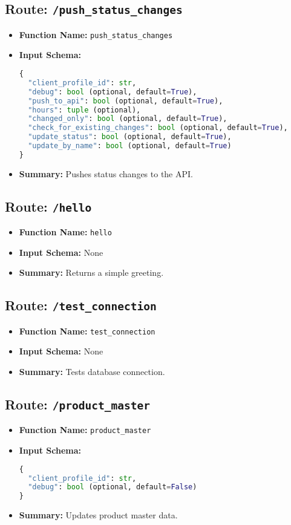 \subsection{Route: \texttt{/push\_status\_changes}}
\begin{itemize}
  \item \textbf{Function Name:} \texttt{push\_status\_changes}
  \item \textbf{Input Schema:}
        \begin{lstlisting}[language=Python]
{
  "client_profile_id": str,
  "debug": bool (optional, default=True),
  "push_to_api": bool (optional, default=True),
  "hours": tuple (optional),
  "changed_only": bool (optional, default=True),
  "check_for_existing_changes": bool (optional, default=True),
  "update_status": bool (optional, default=True),
  "update_by_name": bool (optional, default=True)
}
  \end{lstlisting}
  \item \textbf{Summary:} Pushes status changes to the API.
\end{itemize}

\subsection{Route: \texttt{/hello}}
\begin{itemize}
  \item \textbf{Function Name:} \texttt{hello}
  \item \textbf{Input Schema:} None
  \item \textbf{Summary:} Returns a simple greeting.
\end{itemize}

\subsection{Route: \texttt{/test\_connection}}
\begin{itemize}
  \item \textbf{Function Name:} \texttt{test\_connection}
  \item \textbf{Input Schema:} None
  \item \textbf{Summary:} Tests database connection.
\end{itemize}

\subsection{Route: \texttt{/product\_master}}
\begin{itemize}
  \item \textbf{Function Name:} \texttt{product\_master}
  \item \textbf{Input Schema:}
        \begin{lstlisting}[language=Python]
{
  "client_profile_id": str,
  "debug": bool (optional, default=False)
}
  \end{lstlisting}
  \item \textbf{Summary:} Updates product master data.
\end{itemize}

